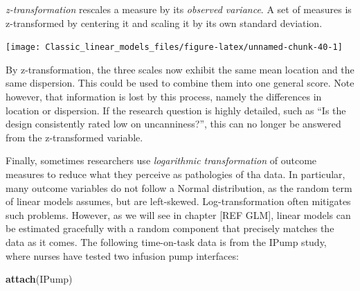 \documentclass[]{svmono}
\newenvironment{Shaded}{\begin{snugshade}}{\end{snugshade}}
\newcommand{\KeywordTok}[1]{\textcolor[rgb]{0.13,0.29,0.53}{\textbf{#1}}}
\newcommand{\DataTypeTok}[1]{\textcolor[rgb]{0.13,0.29,0.53}{#1}}
\newcommand{\DecValTok}[1]{\textcolor[rgb]{0.00,0.00,0.81}{#1}}
\newcommand{\StringTok}[1]{\textcolor[rgb]{0.31,0.60,0.02}{#1}}
\newcommand{\CommentTok}[1]{\textcolor[rgb]{0.56,0.35,0.01}{\textit{#1}}}
\newcommand{\OperatorTok}[1]{\textcolor[rgb]{0.81,0.36,0.00}{\textbf{#1}}}
\newcommand{\NormalTok}[1]{#1}
\begin{document}
\emph{z-transformation} rescales a measure by its \emph{observed
variance}. A set of measures is z-transformed by centering it and
scaling it by its own standard deviation.

\begin{Shaded}
\end{Shaded}

\texttt{[image: Classic\_linear\_models\_files/figure-latex/unnamed-chunk-40-1]}

By z-transformation, the three scales now exhibit the same mean location
and the same dispersion. This could be used to combine them into one
general score. Note however, that information is lost by this process,
namely the differences in location or dispersion. If the research
question is highly detailed, such as ``Is the design consistently rated
low on uncanniness?'', this can no longer be answered from the
z-transformed variable.

Finally, sometimes researchers use \emph{logarithmic transformation} of
outcome measures to reduce what they perceive as pathologies of tha
data. In particular, many outcome variables do not follow a Normal
distribution, as the random term of linear models assumes, but are
left-skewed. Log-transformation often mitigates such problems. However,
as we will see in chapter {[}REF GLM{]}, linear models can be estimated
gracefully with a random component that precisely matches the data as it
comes. The following time-on-task data is from the IPump study, where
nurses have tested two infusion pump interfaces:

\begin{Shaded}
\begin{Highlighting}[]
\KeywordTok{attach}\NormalTok{(IPump)}
\end{Highlighting}
\end{Shaded}
\end{document}
